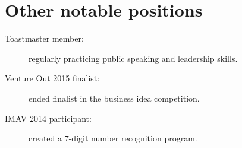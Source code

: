 \documentclass[10pt]{CurriculumVitae}
\begin{document}
  \section{Other notable positions}
    \begin{description}
      \item[Toastmaster member:] regularly practicing public speaking and leadership skills.
      \item[Venture Out 2015 finalist:] ended finalist in the business idea competition.
      \item[IMAV 2014 participant:] created a 7-digit number recognition program.
    \end{description}
\end{document}

